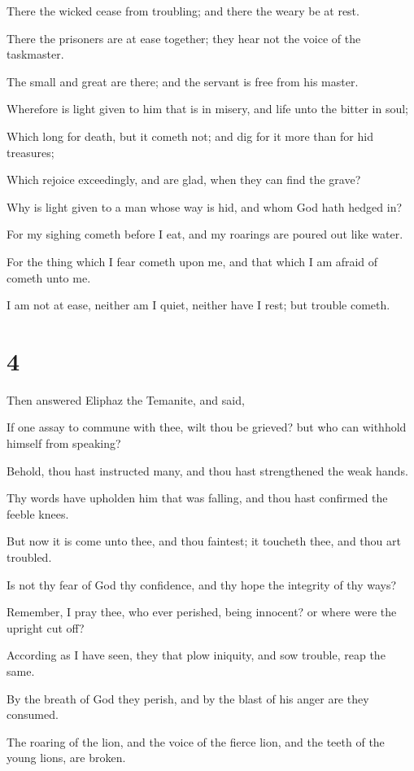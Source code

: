 \documentclass[12pt,oneside]{book}
\begin{document}
There the wicked cease from troubling; and there the weary be at rest.

There the prisoners are at ease together; they hear not the voice of the taskmaster.

The small and great are there; and the servant is free from his master.

Wherefore is light given to him that is in misery, and life unto the bitter in soul;

Which long for death, but it cometh not; and dig for it more than for hid treasures;

Which rejoice exceedingly, and are glad, when they can find the grave?

Why is light given to a man whose way is hid, and whom God hath hedged in?

For my sighing cometh before I eat, and my roarings are poured out like water.

For the thing which I fear cometh upon me, and that which I am afraid of cometh unto me.

I am not at ease, neither am I quiet, neither have I rest; but trouble cometh.

\chapter{4}
Then answered Eliphaz the Temanite, and said,

If one assay to commune with thee, wilt thou be grieved? but who can withhold himself from speaking?

Behold, thou hast instructed many, and thou hast strengthened the weak hands.

Thy words have upholden him that was falling, and thou hast confirmed the feeble knees.

But now it is come unto thee, and thou faintest; it toucheth thee, and thou art troubled.

Is not thy fear of God thy confidence, and thy hope the integrity of thy ways?

Remember, I pray thee, who ever perished, being innocent? or where were the upright cut off?

According as I have seen, they that plow iniquity, and sow trouble, reap the same.

By the breath of God they perish, and by the blast of his anger are they consumed.

The roaring of the lion, and the voice of the fierce lion, and the teeth of the young lions, are broken.
\end{document}
